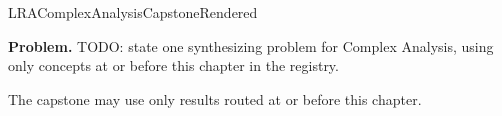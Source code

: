 \ifcsname LRAComplexAnalysisCapstoneRendered\endcsname
\else
\expandafter\gdef\csname LRAComplexAnalysisCapstoneRendered\endcsname{}

\newpage
{}
\label{cap:complex-analysis}

\begin{tcolorbox}[
  colback=gray!6,
  colframe=gray!40,
  arc=2pt,
  left=8pt, right=8pt, top=6pt, bottom=6pt,
  title={\small\textbf{Capstone Problem}},
  fonttitle=\small\bfseries
]
\textbf{Problem.}
TODO: state one synthesizing problem for Complex Analysis, using only concepts at or
before this chapter in the registry.
\end{tcolorbox}

\begin{remark*}
The capstone may use only results routed at or before this chapter.
\end{remark*}

\clearpage
\fi
